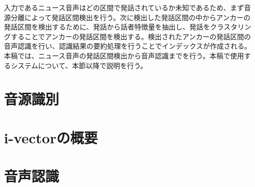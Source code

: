 入力であるニュース音声はどの区間で発話されているか未知であるため、まず音源分離によって発話区間検出を行う。次に検出した発話区間の中からアンカーの発話区間を検出するために、発話から話者特徴量を抽出し、発話をクラスタリングすることでアンカーの発話区間を検出する。検出されたアンカーの発話区間の音声認識を行い、認識結果の要約処理を行うことでインデックスが作成される。本稿では、ニュース音声の発話区間検出から音声認識までを行う。本稿で使用するシステムについて、本節以降で説明を行う。

\section{音源識別}
\label{section:devide_audio}


\section{i-vectorの概要}


\section{音声認識}

